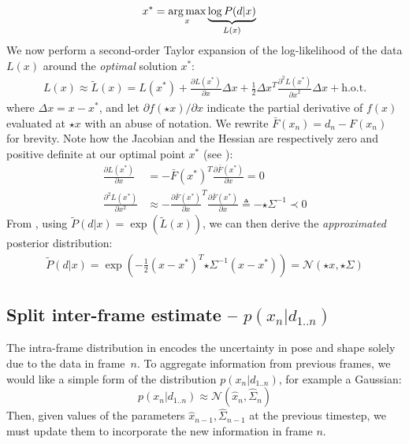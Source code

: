 %
\begin{align}
x^* &= \operatorname*{arg\,max}_{x} \underbrace{\log  P(d|x)}_{L(x)}
\label{eq:independent}
\end{align}
%
We now perform a second-order Taylor expansion of the log-likelihood of the data $L(x)$ around the \emph{optimal} solution $x^*$:
%
\begin{align}
L(x) \approx \tilde{L}(x) = L(x^*)   
+ \tfrac{\partial L(x^*) }{\partial x}  \Delta x 
+ \tfrac{1}{2} \Delta x^T\tfrac{\partial^2 L(x^*)}{{\partial x}^2} \Delta x + \text{h.o.t.}
\label{eq:taylor}
\end{align}
%
where $\Delta x=x - x^*$, and let {\small $\partial f(\star{x})/\partial x$} indicate the partial derivative of $f(x)$ evaluated at $\star{x}$  with an abuse of notation. We rewrite {\small $\bar{F}(x_n) = d_n - F(x_n)$} for brevity. Note how the Jacobian and the Hessian are respectively zero and positive definite at our optimal point $x^*$ (see \cite[Sec.~10.2]{nocedal2006numerical}):
%
\begin{align}
\tfrac{\partial L(x^*)}{\partial x} &= - \bar{F}(x^*)^T 
\tfrac{\partial \bar{F}(x^*)}{\partial x} = 0 
\label{eq:taylor-jacobian}
\\
\tfrac{\partial^2 L(x^*)}{\partial x^2} 
& \approx - \tfrac{\partial \bar{F}(x^*)}{\partial x}^T \tfrac{\partial \bar{F}(x^*)}{\partial x}
\triangleq %
-{\star{\Sigma}}^{-1} \prec 0
\label{eq:taylor-hessian}
\end{align}
% 
From , using $\tilde P(d|x) = \exp (\tilde{L}(x))$, we can then derive the \emph{approximated} posterior distribution:
%
\begin{align}
\tilde{P}(d|x) = \exp\left(- \tfrac{1}{2}(x - x^*)^T {\star{\Sigma}}^{-1}  (x - x^*) \right) = \mathcal{N}\left(\star{x}, \star{\Sigma} \right)
\end{align}
\fi



\subsection{Split inter-frame estimate -- $p(x_n|d_{1..n})$}
\label{sec:split}
The intra-frame distribution in  encodes the uncertainty in pose and shape solely due to the data in frame~$n$.  To aggregate information from previous frames, we would like a simple form of the distribution $p(x_n|d_{1..n}) $, for example a Gaussian:
\begin{equation}
p(x_n|d_{1..n}) \approx \mathcal{N}(\hat{x}_n, \hat{\Sigma}_n)
\end{equation}
Then, given values of the parameters $\hat{x}_{n-1}, \hat{\Sigma}_{n-1}$ at the previous timestep, we must update them to incorporate the new information in frame $n$.   
%


